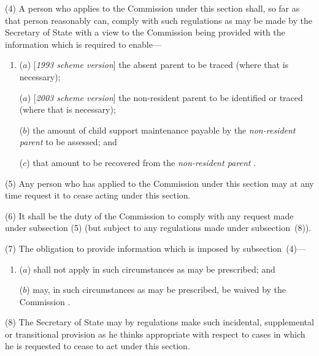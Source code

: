 \documentclass[12pt,a4paper]{article}
\begin{document}
(4) A person who applies to the 
Commission  %
under this section shall, so far as that person reasonably can, comply with such regulations as may be made by the Secretary of State with a view to the 
Commission  %
being provided with the information which is required to enable—
\begin{enumerate}\item[]
($a$) [\emph{1993 scheme version}] the absent parent to be traced (where that is necessary);

($a$) [\emph{2003 scheme version}] the 
non-resident parent  %
to be 
identified or  %
traced (where that is necessary);

($b$) the amount of child support maintenance payable by the 
\emph{non-resident parent}  %
to be assessed; and

($c$) that amount to be recovered from the 
\emph{non-resident parent}%
.
\end{enumerate}

(5) Any person who has applied to the 
Commission  %
under this section may at any time request 
it  %
to cease acting under this section.

(6) It shall be the duty of the 
Commission  %
to comply with any request made under subsection (5)  (but subject to any regulations made under subsection~(8)).

(7) The obligation to provide information which is imposed by subsection~(4)—
\begin{enumerate}\item[]
($a$) shall not apply in such circumstances as may be prescribed; and

($b$) may, in such circumstances as may be prescribed, be waived by the 
Commission%
.
\end{enumerate}

(8) The Secretary of State may by regulations make such incidental, supplemental or transitional provision as he thinks appropriate with respect to cases in which he is requested to cease to act under this section.
\end{document}
